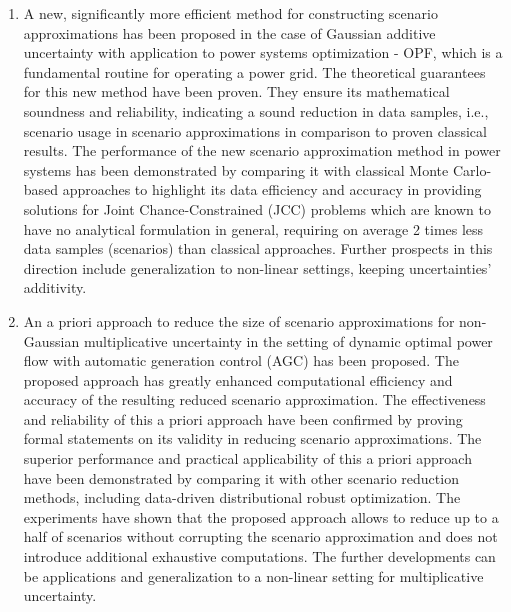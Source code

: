 \begin{enumerate}
    \item A new, significantly more efficient method for constructing scenario approximations has been proposed in the case of Gaussian additive uncertainty with application to power systems optimization - OPF, which is a fundamental routine for operating a power grid. The theoretical guarantees for this new method have been proven. They ensure its mathematical soundness and reliability, indicating a sound reduction in data samples, i.e., scenario usage in scenario approximations in comparison to proven classical results. The performance of the new scenario approximation method in power systems has been demonstrated by comparing it with classical Monte Carlo-based approaches to highlight its data efficiency and accuracy in providing solutions for Joint Chance-Constrained (JCC) problems which are known to have no analytical formulation in general, requiring on average 2 times less data samples (scenarios) than classical approaches. Further prospects in this direction include generalization to non-linear settings, keeping uncertainties' additivity.
    \item An a priori approach to reduce the size of scenario approximations for non-Gaussian multiplicative uncertainty in the setting of dynamic optimal power flow with automatic generation control (AGC) has been proposed. The proposed approach has greatly enhanced computational efficiency and accuracy of the resulting reduced scenario approximation. 
    The effectiveness and reliability of this a priori approach have been confirmed by proving formal statements on its validity in reducing scenario approximations.
    The superior performance and practical applicability of this a priori approach have been demonstrated by comparing it with other scenario reduction methods, including data-driven distributional robust optimization. The experiments have shown that the proposed approach allows to reduce up to a half of scenarios without corrupting the scenario approximation and does not introduce additional exhaustive computations. The further developments can be applications and generalization to a non-linear setting for multiplicative uncertainty.
\end{enumerate}
